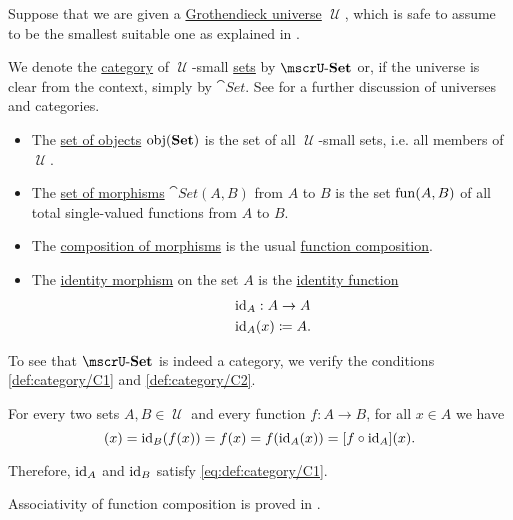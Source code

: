 \begin{definition}\label{def:category_of_small_sets}
  Suppose that we are given a \hyperref[def:grothendieck_universe]{Grothendieck universe} \( \mscrU \), which is safe to assume to be the smallest suitable one as explained in .

  We denote the \hyperref[def:category]{category} of \( \mscrU \)-small \hyperref[def:set]{sets} by \( \ucat{Set} \) or, if the universe is clear from the context, simply by \( \cat{Set} \). See  for a further discussion of universes and categories.

  \begin{itemize}
    \item The \hyperref[def:category/objects]{set of objects} \( \operatorname{obj}(\operatorname{\mathbf{Set}}) \) is the set of all \( \mscrU \)-small sets, i.e. all members of \( \mscrU \).

    \item The \hyperref[def:category/morphisms]{set of morphisms} \( \cat{Set}(A, B) \) from \( A \) to \( B \) is the set \hyperref[def:function/set_of_functions]{\( \operatorname{fun}(A, B) \)} of all total single-valued functions from \( A \) to \( B \).

    \item The \hyperref[def:category/composition]{composition of morphisms} is the usual \hyperref[def:multi_valued_function/composition]{function composition}.

    \item The \hyperref[def:category/identity]{identity morphism} on the set \( A \) is the \hyperref[def:multi_valued_function/identity]{identity function}
    \begin{equation*}
      \begin{aligned}
        &\operatorname{id}_A: A \to A \\
        &\operatorname{id}_A(x) \coloneqq A.
      \end{aligned}
    \end{equation*}
  \end{itemize}
\end{definition}
\begin{defproof}
  To see that \( \ucat{Set} \) is indeed a category, we verify the conditions \ref{def:category/C1} and \ref{def:category/C2}.

   For every two sets \( A, B \in \mscrU \) and every function \( f: A \to B \), for all \( x \in A \) we have
  \begin{equation*}
    [\id_B \bincirc f](x)
    =
    \id_B(f(x))
    =
    f(x)
    =
    f(\id_A(x))
    =
    [f \bincirc \id_A](x).
  \end{equation*}

  Therefore, \( \operatorname{id}_A \) and \( \operatorname{id}_B \) satisfy \eqref{eq:def:category/C1}.

   Associativity of function composition is proved in .
\end{defproof}

